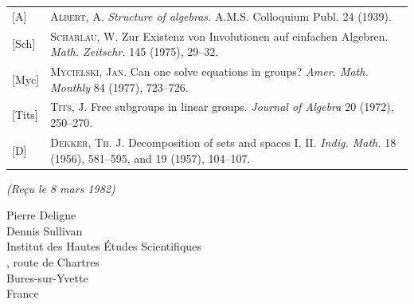 \documentclass[12pt,a4paper]{article}
\theoremstyle{plain}
\theoremstyle{remark}
\begin{document}
\noindent
\begin{tabular}{@{}p{1cm}p{13cm}@{}}
{[A]} & \textsc{Albert, A.} \textit{Structure of algebras.} A.M.S. Colloquium Publ. 24 (1939). \\[0.5em]
{[Sch]} & \textsc{Scharlau, W.} Zur Existenz von Involutionen auf einfachen Algebren. \textit{Math.
Zeitschr.} 145 (1975), 29--32. \\[0.5em]
{[Myc]} & \textsc{Mycielski, Jan.} Can one solve equations in groups? \textit{Amer. Math. Monthly} 84
(1977), 723--726. \\[0.5em]
{[Tits]} & \textsc{Tits, J.} Free subgroups in linear groups. \textit{Journal of Algebra} 20 (1972), 250--270. \\[0.5em]
{[D]} & \textsc{Dekker, Th. J.} Decomposition of sets and spaces I, II. \textit{Indig. Math.} 18 (1956),
581--595, and 19 (1957), 104--107.
\end{tabular}

\vspace{0.8cm}
\hfill\textit{(Re\c{c}u le 8 mars 1982)}

\vspace{0.8cm}
\noindent
Pierre Deligne\\
Dennis Sullivan\\
\null\quad Institut des Hautes \'{E}tudes Scientifiques\\
\null{}, route de Chartres\\
\null{} Bures-sur-Yvette\\
\null\quad France
\end{document}
